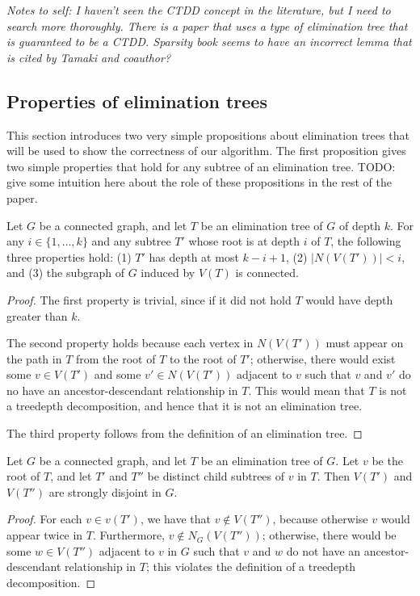 \emph{Notes to self: I haven't seen the CTDD concept in the literature, but I need to search
more thoroughly.  There is a paper that uses a type of elimination tree that is guaranteed
to be a CTDD.  Sparsity book seems to have an incorrect lemma that is cited by Tamaki
and coauthor?}

\subsection{Properties of elimination trees}

This section introduces two very simple propositions about elimination trees
that will be used to show the correctness of our algorithm.  The first
proposition gives two simple properties that hold for any subtree of an
elimination tree.  TODO: give some intuition here about the role of these
propositions in the rest of the paper.

\begin{proposition}\label{subtreeproposition}
Let $G$ be a connected graph, and let $T$ be an elimination tree of $G$ of depth $k$.  For any $i \in \{1, \dots, k\}$
and any subtree $T'$ whose root is at depth
$i$ of $T$, the following three properties hold: (1) $T'$ has depth at most $k-i+1$, (2) $|N(V(T'))| < i$,
and (3) the subgraph of $G$ induced by $V(T)$ is connected.
\end{proposition}
\begin{proof}
The first property is trivial, since if it did not hold $T$ would have depth greater than $k$.

The second property holds because each vertex in $N(V(T'))$ must appear on the path
in $T$ from the root of $T$ to the root of $T'$; otherwise, there would exist some $v \in V(T')$
and some $v' \in N(V(T'))$ adjacent to $v$ such that $v$ and $v'$ do no have an ancestor-descendant
relationship in $T$.  This would mean that $T$ is not a treedepth decomposition, and hence
that it is not an elimination tree.

The third property follows from the definition of an elimination tree.
\end{proof}

\begin{proposition}\label{joiningETproposition}
Let $G$ be a connected graph, and let $T$ be an elimination tree of $G$.  Let $v$ be the root of $T$,
and let $T'$ and $T''$ be distinct child subtrees of $v$ in $T$.  Then
$V(T')$ and $V(T'')$ are strongly disjoint in $G$.
\end{proposition}
\begin{proof}
For each $v \in v(T')$, we have that $v \not\in V(T'')$, because otherwise
$v$ would appear twice in $T$.  Furthermore, $v \not\in N_G(V(T''))$; otherwise, there would
be some $w \in V(T'')$ adjacent to $v$ in $G$ such that $v$ and $w$ do not have an ancestor-descendant
relationship in $T$; this violates the definition of a treedepth decomposition.
\end{proof}



